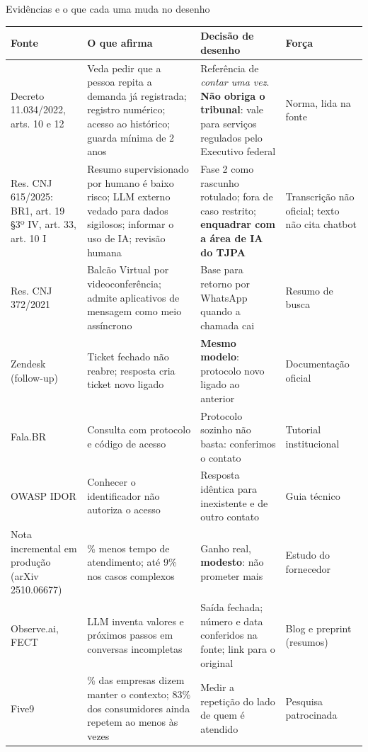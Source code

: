 \documentclass[aspectratio=169,10pt]{beamer}
\begin{document}
\begin{frame}{Evidências e o que cada uma muda no desenho}
\fontsize{6.0}{7.0}\selectfont
\begin{tabularx}{\linewidth}{@{}>{\raggedright\arraybackslash}p{2.7cm}>{\raggedright\arraybackslash}X>{\raggedright\arraybackslash}X>{\raggedright\arraybackslash}p{2.2cm}@{}}
\toprule
Fonte & O que afirma & Decisão de desenho & Força \\
\midrule
Decreto 11.034/2022, arts. 10 e 12 & Veda pedir que a pessoa repita a demanda já registrada; registro numérico; acesso ao histórico; guarda mínima de 2 anos & Referência de \emph{contar uma vez}. \textbf{Não obriga o tribunal}: vale para serviços regulados pelo Executivo federal & Norma, lida na fonte \\
Res. CNJ 615/2025: BR1, art. 19 §3º IV, art. 33, art. 10 I & Resumo supervisionado por humano é baixo risco; LLM externo vedado para dados sigilosos; informar o uso de IA; revisão humana & Fase 2 como rascunho rotulado; fora de caso restrito; \textbf{enquadrar com a área de IA do TJPA} & Transcrição não oficial; texto não cita chatbot \\
Res. CNJ 372/2021 & Balcão Virtual por videoconferência; admite aplicativos de mensagem como meio assíncrono & Base para retorno por WhatsApp quando a chamada cai & Resumo de busca \\
Zendesk (follow-up) & Ticket fechado não reabre; resposta cria ticket novo ligado & \textbf{Mesmo modelo}: protocolo novo ligado ao anterior & Documentação oficial \\
Fala.BR & Consulta com protocolo e código de acesso & Protocolo sozinho não basta: conferimos o contato & Tutorial institucional \\
OWASP IDOR & Conhecer o identificador não autoriza o acesso & Resposta idêntica para inexistente e de outro contato & Guia técnico \\
Nota incremental em produção (arXiv 2510.06677) & 3\% menos tempo de atendimento; até 9\% nos casos complexos & Ganho real, \textbf{modesto}: não prometer mais & Estudo do fornecedor \\
Observe.ai, FECT & LLM inventa valores e próximos passos em conversas incompletas & Saída fechada; número e data conferidos na fonte; link para o original & Blog e preprint (resumos) \\
Five9 & 96\% das empresas dizem manter o contexto; 83\% dos consumidores ainda repetem ao menos às vezes & Medir a repetição do lado de quem é atendido & Pesquisa patrocinada \\
\bottomrule
\end{tabularx}
\end{frame}
\end{document}

